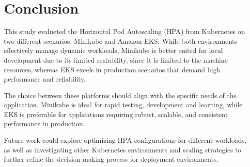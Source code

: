 \section{Conclusion}
This study evalueted the Horizontal Pod Autoscaling (HPA) from Kubernetes on two different scenarios: Minikube and Amazon EKS. While both environments effectively manage dynamic workloads, Minikube is better suited for local development due to its limited scalability, since it is limited to the machine resources, whereas EKS excels in production scenarios that demand high performance and reliability.

The choice between these platforms should align with the specific needs of the application. Minikube is ideal for rapid testing, development and learning, while EKS is preferable for applications requiring robust, scalable, and consistent performance in production.

Future work could explore optimizing HPA configurations for different workloads, as well as investigating other Kubernetes environments and scaling strategies to further refine the decision-making process for deployment environments.
